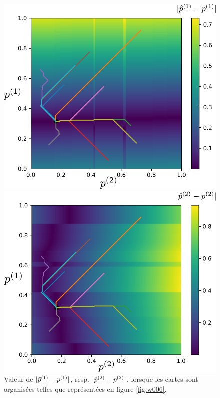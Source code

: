 \documentclass[../main]{subfiles}
\begin{document}
\begin{figure}
\begin{minipage}{0.5\textwidth}
\centering
\includegraphics[width=\textwidth]{champ_X_006.pdf}
\end{minipage}
\begin{minipage}{0.5\textwidth}
\centering
\includegraphics[width=\textwidth]{champ_Y_006.pdf}
\end{minipage}
\caption{Valeur de $\lvert{\hat{p}}^{({1})} - p^{({1})}\rvert$, resp. $\lvert{\hat{p}}^{({2})} - p^{({2})}\rvert$, lorsque les cartes sont organisées telles que représentées en figure \ref{fig:w006}. 
}
\end{figure}
\end{document}
